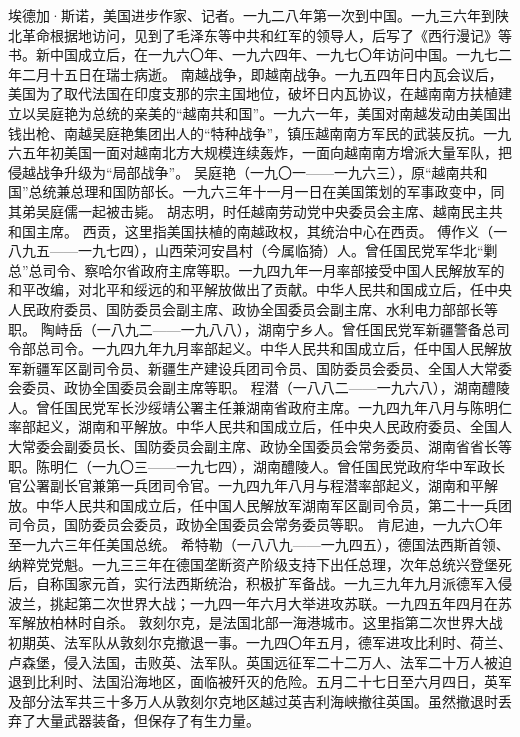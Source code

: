 \begin{maonote}
埃德加·斯诺，美国进步作家、记者。一九二八年第一次到中国。一九三六年到陕北革命根据地访问，见到了毛泽东等中共和红军的领导人，后写了《西行漫记》等书。新中国成立后，在一九六〇年、一九六四年、一九七〇年访问中国。一九七二年二月十五日在瑞士病逝。
南越战争，即越南战争。一九五四年日内瓦会议后，美国为了取代法国在印度支那的宗主国地位，破坏日内瓦协议，在越南南方扶植建立以吴庭艳为总统的亲美的“越南共和国”。一九六一年，美国对南越发动由美国出钱出枪、南越吴庭艳集团出人的“特种战争”，镇压越南南方军民的武装反抗。一九六五年初美国一面对越南北方大规模连续轰炸，一面向越南南方增派大量军队，把侵越战争升级为“局部战争”。
吴庭艳（一九〇一——一九六三），原“越南共和国”总统兼总理和国防部长。一九六三年十一月一日在美国策划的军事政变中，同其弟吴庭儒一起被击毙。
胡志明，时任越南劳动党中央委员会主席、越南民主共和国主席。
西贡，这里指美国扶植的南越政权，其统治中心在西贡。
傅作义（一八九五——一九七四），山西荣河安昌村（今属临猗）人。曾任国民党军华北“剿总”总司令、察哈尔省政府主席等职。一九四九年一月率部接受中国人民解放军的和平改编，对北平和绥远的和平解放做出了贡献。中华人民共和国成立后，任中央人民政府委员、国防委员会副主席、政协全国委员会副主席、水利电力部部长等职。
陶峙岳（一八九二——一九八八），湖南宁乡人。曾任国民党军新疆警备总司令部总司令。一九四九年九月率部起义。中华人民共和国成立后，任中国人民解放军新疆军区副司令员、新疆生产建设兵团司令员、国防委员会委员、全国人大常委会委员、政协全国委员会副主席等职。
程潜（一八八二——一九六八），湖南醴陵人。曾任国民党军长沙绥靖公署主任兼湖南省政府主席。一九四九年八月与陈明仁率部起义，湖南和平解放。中华人民共和国成立后，任中央人民政府委员、全国人大常委会副委员长、国防委员会副主席、政协全国委员会常务委员、湖南省省长等职。陈明仁（一九〇三——一九七四），湖南醴陵人。曾任国民党政府华中军政长官公署副长官兼第一兵团司令官。一九四九年八月与程潜率部起义，湖南和平解放。中华人民共和国成立后，任中国人民解放军湖南军区副司令员，第二十一兵团司令员，国防委员会委员，政协全国委员会常务委员等职。
肯尼迪，一九六〇年至一九六三年任美国总统。
希特勒（一八八九——一九四五），德国法西斯首领、纳粹党党魁。一九三三年在德国垄断资产阶级支持下出任总理，次年总统兴登堡死后，自称国家元首，实行法西斯统治，积极扩军备战。一九三九年九月派德军入侵波兰，挑起第二次世界大战；一九四一年六月大举进攻苏联。一九四五年四月在苏军解放柏林时自杀。
敦刻尔克，是法国北部一海港城市。这里指第二次世界大战初期英、法军队从敦刻尔克撤退一事。一九四〇年五月，德军进攻比利时、荷兰、卢森堡，侵入法国，击败英、法军队。英国远征军二十二万人、法军二十万人被迫退到比利时、法国沿海地区，面临被歼灭的危险。五月二十七日至六月四日，英军及部分法军共三十多万人从敦刻尔克地区越过英吉利海峡撤往英国。虽然撤退时丢弃了大量武器装备，但保存了有生力量。

\end{maonote}
